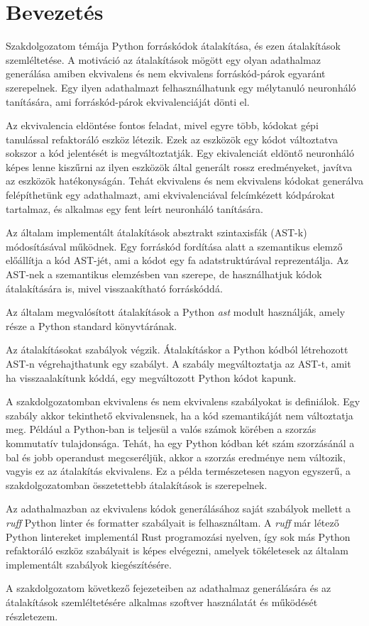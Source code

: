 \chapter{Bevezetés}
\label{ch:intro}

Szakdolgozatom témája Python forráskódok átalakítása, és ezen átalakítások szemléltetése.
A motiváció az átalakítások mögött egy olyan adathalmaz generálása amiben ekvivalens és nem
ekvivalens 
forráskód-párok egyaránt szerepelnek. Egy ilyen adathalmazt felhasználhatunk egy mélytanuló
neuronháló tanítására,
ami forráskód-párok ekvivalenciáját dönti el.

Az ekvivalencia eldöntése fontos feladat, mivel egyre több, kódokat gépi tanulással refaktoráló
eszköz létezik.
Ezek az eszközök egy kódot változtatva sokszor a kód jelentését is megváltoztatják.
Egy ekivalenciát eldöntő neuronháló képes lenne kiszűrni az ilyen eszközök által generált
rossz eredményeket, javítva az eszközök hatékonyságán.
Tehát ekvivalens és nem ekvivalens kódokat generálva felépíthetünk egy adathalmazt, ami
ekvivalenciával felcímkézett kódpárokat tartalmaz, és alkalmas egy fent leírt neuronháló
tanítására.

Az általam implementált átalakítások absztrakt szintaxisfák (AST-k) módosításával működnek.
Egy forráskód fordítása alatt a szemantikus elemző előállítja a kód AST-jét,
ami a kódot egy fa adatstruktúrával reprezentálja.
Az AST-nek a szemantikus elemzésben van szerepe,
de használhatjuk kódok átalakítására is, mivel visszaakítható forráskóddá.

Az általam megvalósított átalakítások a Python \emph{ast} modult \cite{pythonAST} használják,
amely része a Python standard könyvtárának.

\pagebreak

Az átalakításokat szabályok végzik. Átalakításkor 
a Python kódból létrehozott AST-n végrehajthatunk egy szabályt.
A szabály megváltoztatja az AST-t, amit ha visszaalakítunk kóddá,
egy megváltozott Python kódot kapunk.

A szakdolgozatomban ekvivalens és nem ekvivalens szabályokat is definiálok.
Egy szabály akkor tekinthető ekvivalensnek, ha a kód szemantikáját nem változtatja meg.
Például a Python-ban is teljesül a valós számok körében a szorzás kommutatív tulajdonsága.
Tehát, ha egy Python kódban két szám szorzásánál a bal és jobb operandust megcseréljük,
akkor a szorzás eredménye nem változik, vagyis ez az átalakítás ekvivalens.
Ez a példa természetesen nagyon egyszerű, a szakdolgozatomban összetettebb átalakítások
is szerepelnek.

Az adathalmazban az ekvivalens kódok generálásához saját szabályok mellett
a \emph{ruff} Python linter és formatter szabályait is felhasználtam.
A \emph{ruff} már létező Python lintereket implementál Rust programozási nyelven,
így sok más Python refaktoráló eszköz szabályait is képes elvégezni,
amelyek tökéletesek az általam implementált szabályok kiegészítésére.

A szakdolgozatom következő fejezeteiben az adathalmaz generálására és az átalakítások
szemléltetésére alkalmas szoftver használatát és működését részletezem.
